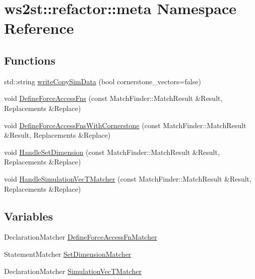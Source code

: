 \hypertarget{namespacews2st_1_1refactor_1_1meta}{}\section{ws2st\+:\+:refactor\+:\+:meta Namespace Reference}
\label{namespacews2st_1_1refactor_1_1meta}
\subsection*{Functions}
\begin{DoxyCompactItemize}
\item 
std\+::string \mbox{\hyperlink{namespacews2st_1_1refactor_1_1meta_a4b5728ea58eb871304333ce7c6c47cd6}{write\+Copy\+Sim\+Data}} (bool cornerstone\+\_\+vectors=false)
\item 
void \mbox{\hyperlink{namespacews2st_1_1refactor_1_1meta_a2e4215c11c119b7a1be831c322e5a194}{Define\+Force\+Access\+Fns}} (const Match\+Finder\+::\+Match\+Result \&Result, Replacements \&Replace)
\item 
void \mbox{\hyperlink{namespacews2st_1_1refactor_1_1meta_a875c1b589222dda87c5364f9473e604e}{Define\+Force\+Access\+Fns\+With\+Cornerstone}} (const Match\+Finder\+::\+Match\+Result \&Result, Replacements \&Replace)
\item 
void \mbox{\hyperlink{namespacews2st_1_1refactor_1_1meta_a9e84e2bed85ead358d092df7f249b512}{Handle\+Set\+Dimension}} (const Match\+Finder\+::\+Match\+Result \&Result, Replacements \&Replace)
\item 
void \mbox{\hyperlink{namespacews2st_1_1refactor_1_1meta_a8da5cd318e06b038ff641081d2b21f2d}{Handle\+Simulation\+Vec\+T\+Matcher}} (const Match\+Finder\+::\+Match\+Result \&Result, Replacements \&Replace)
\end{DoxyCompactItemize}
\subsection*{Variables}
\begin{DoxyCompactItemize}
\item 
Declaration\+Matcher \mbox{\hyperlink{namespacews2st_1_1refactor_1_1meta_a341e8a9e350c69aae8ce4e616345c9a6}{Define\+Force\+Access\+Fn\+Matcher}}
\item 
Statement\+Matcher \mbox{\hyperlink{namespacews2st_1_1refactor_1_1meta_abb0b59f78b21df355ad41833e9043648}{Set\+Dimension\+Matcher}}
\item 
Declaration\+Matcher \mbox{\hyperlink{namespacews2st_1_1refactor_1_1meta_a1d7378d88c577045f1b492e33a42ec13}{Simulation\+Vec\+T\+Matcher}}
\end{DoxyCompactItemize}


